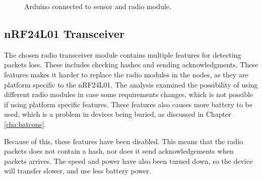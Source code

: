 \begin{figure}[!h]
	\centering
	\caption{Arduino connected to sensor and radio module.}
	\label{fig:compsketch}
\end{figure}

\subsection{nRF24L01 Transceiver}
The chosen radio transceiver module contains multiple features for detecting packets loss. These includes checking hashes and sending acknowledgments\cite{nf24datasheet}.
These features makes it harder to replace the radio modules in the nodes, as they are platform specific to the nRF24L01. The analysis examined the possibility of using different radio modules in case some requirements changes, which is not possible if using platform specific features. These features also causes more battery to be used, which is a problem in devices being buried, as discussed in Chapter \ref{cha:batcons}.

Because of this, these features have been disabled. This means that the radio packets does not contain a hash, nor does it send acknowledgements when packets arrives. The speed and power have also been turned down, so the device will transfer slower, and use less battery power.
